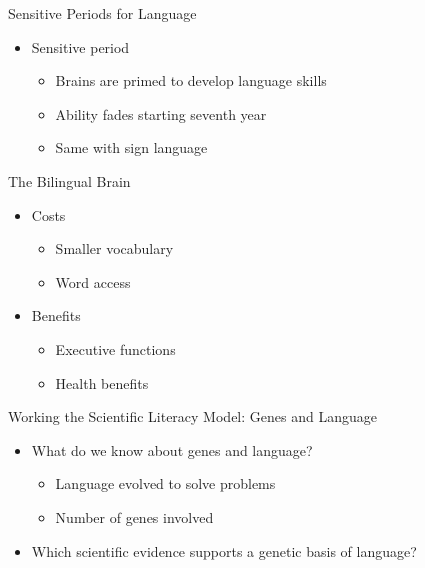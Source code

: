 \documentclass[
]{book}
\providecommand{\tightlist}{%
  \setlength{\itemsep}{0pt}\setlength{\parskip}{0pt}}
\begin{document}
\begin{reflect}
Sensitive Periods for Language

\begin{itemize}
\tightlist
\item
  Sensitive period

  \begin{itemize}
  \tightlist
  \item
    Brains are primed to develop language skills\\
  \item
    Ability fades starting seventh year\\
  \item
    Same with sign language
  \end{itemize}
\end{itemize}

The Bilingual Brain

\begin{itemize}
\tightlist
\item
  Costs

  \begin{itemize}
  \tightlist
  \item
    Smaller vocabulary\\
  \item
    Word access
  \end{itemize}
\item
  Benefits

  \begin{itemize}
  \tightlist
  \item
    Executive functions\\
  \item
    Health benefits
  \end{itemize}
\end{itemize}

Working the Scientific Literacy Model: Genes and Language

\begin{itemize}
\tightlist
\item
  What do we know about genes and language?

  \begin{itemize}
  \tightlist
  \item
    Language evolved to solve problems\\
  \item
    Number of genes involved
  \end{itemize}
\item
  Which scientific evidence supports a genetic basis of language?


\end{itemize}
\end{reflect}
\end{document}
